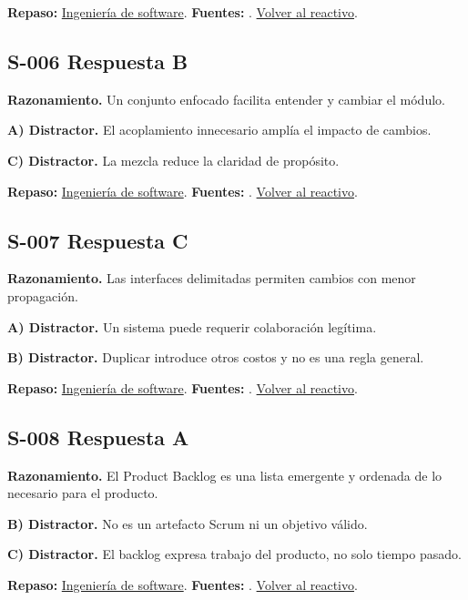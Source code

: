 \textbf{Repaso:} \hyperref[sec:s1]{Ingeniería de software}. \textbf{Fuentes:} \cite{scrum,swebok}. \hyperref[q:S-005]{Volver al reactivo}.\par\medskip

\subsection*{S-006 \quad Respuesta B}\label{s:S-006}
\textbf{Razonamiento.} Un conjunto enfocado facilita entender y cambiar el módulo.

\textbf{A) Distractor. }El acoplamiento innecesario amplía el impacto de cambios.

\textbf{C) Distractor. }La mezcla reduce la claridad de propósito.

\textbf{Repaso:} \hyperref[sec:s1]{Ingeniería de software}. \textbf{Fuentes:} \cite{scrum,swebok}. \hyperref[q:S-006]{Volver al reactivo}.\par\medskip

\subsection*{S-007 \quad Respuesta C}\label{s:S-007}
\textbf{Razonamiento.} Las interfaces delimitadas permiten cambios con menor propagación.

\textbf{A) Distractor. }Un sistema puede requerir colaboración legítima.

\textbf{B) Distractor. }Duplicar introduce otros costos y no es una regla general.

\textbf{Repaso:} \hyperref[sec:s1]{Ingeniería de software}. \textbf{Fuentes:} \cite{scrum,swebok}. \hyperref[q:S-007]{Volver al reactivo}.\par\medskip

\subsection*{S-008 \quad Respuesta A}\label{s:S-008}
\textbf{Razonamiento.} El Product Backlog es una lista emergente y ordenada de lo necesario para el producto.

\textbf{B) Distractor. }No es un artefacto Scrum ni un objetivo válido.

\textbf{C) Distractor. }El backlog expresa trabajo del producto, no solo tiempo pasado.

\textbf{Repaso:} \hyperref[sec:s1]{Ingeniería de software}. \textbf{Fuentes:} \cite{scrum}. \hyperref[q:S-008]{Volver al reactivo}.\par\medskip

